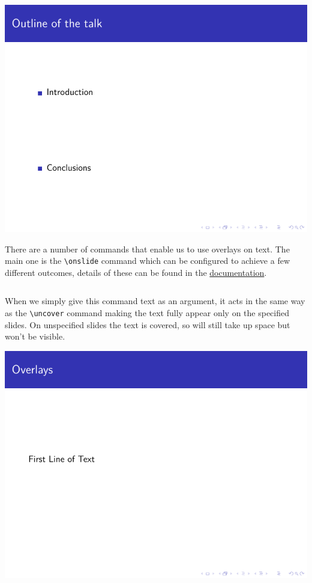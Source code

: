 \begin{column}{0.5\textwidth}
\includegraphics[page=1]{examples/beamer/overlay-list.pdf}

There are a number of commands that enable us to use overlays on text. The main one is the \verb|\onslide| command which can be configured to achieve a few different outcomes, details of these can be found in the \href{http://mirrors.ctan.org/macros/latex/contrib/beamer/doc/beameruserguide.pdf}{documentation}.

\inputminted[linenos=true]{latex}{examples/beamer/overlay-onslide.tex}

When we simply give this command text as an argument, it acts in the same way as the \verb|\uncover| command making the text fully appear only on the specified slides. On unspecified slides the text is covered, so will still take up space but won't be visible.

\includegraphics[page=1]{examples/beamer/overlay-onslide.pdf}


\end{column}
